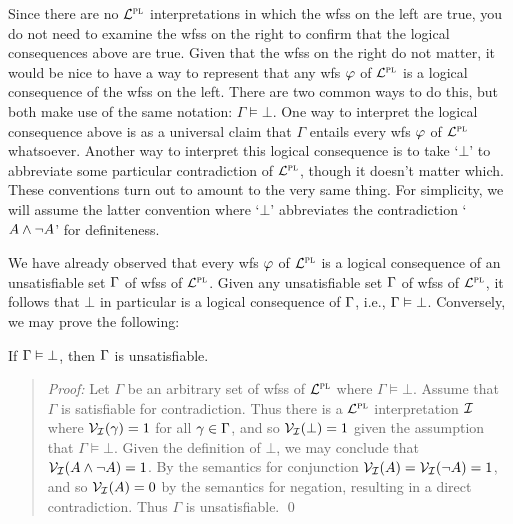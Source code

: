 \begin{earg}
\end{earg}

Since there are no $\mathcal{L}^{\textsc{pl}}$ interpretations in which the wfss on the left are true, you do not need to examine the wfss on the right to confirm that the logical consequences above are true.
Given that the wfss on the right do not matter, it would be nice to have a way to represent that any wfs $\varphi$ of $\mathcal{L}^{\textsc{pl}}$ is a logical consequence of the wfss on the left.
There are two common ways to do this, but both make use of the same notation: $\Gamma \vDash \bot$.
One way to interpret the logical consequence above is as a universal claim that $\Gamma$ entails every wfs $\varphi$ of $\mathcal{L}^{\textsc{pl}}$ whatsoever. 
Another way to interpret this logical consequence is to take `$\bot$' to abbreviate some particular contradiction of $\mathcal{L}^{\textsc{pl}}$, though it doesn't matter which.
These conventions turn out to amount to the very same thing.
For simplicity, we will assume the latter convention where `$\bot$' abbreviates the contradiction `$A \wedge \neg A$' for definiteness.

We have already observed that every wfs $\varphi$ of $\mathcal{L}^{\textsc{pl}}$ is a logical consequence of an unsatisfiable set $\Gamma$ of wfss of $\mathcal{L}^{\textsc{pl}}$.
Given any unsatisfiable set $\Gamma$ of wfss of $\mathcal{L}^{\textsc{pl}}$, it follows that $\bot$ in particular is a logical consequence of $\Gamma$, i.e., $\Gamma \vDash \bot$. 
Conversely, we may prove the following: 

\begin{Lthm} \label{lemma:PL-consequence_unsat}
  If $\Gamma \vDash \bot$, then $\Gamma$ is unsatisfiable. 
\end{Lthm} \vspace{-.2in}

\begin{quote} 
  \textit{Proof:}
  Let $\Gamma$ be an arbitrary set of wfss of $\mathcal{L}^{\textsc{pl}}$ where $\Gamma \vDash \bot$.
  Assume that $\Gamma$ is satisfiable for contradiction.
  Thus there is a $\mathcal{L}^{\textsc{pl}}$ interpretation $\mathcal{I}$ where $\mathcal{V}_{\mathcal{I}}(\gamma) = 1$ for all $\gamma \in \Gamma$, and so $\mathcal{V}_{\mathcal{I}}(\bot) = 1$ given the assumption that $\Gamma \vDash \bot$.
  Given the definition of $\bot$, we may conclude that $\mathcal{V}_{\mathcal{I}}(A \wedge \neg A) = 1$.
  By the semantics for conjunction $\mathcal{V}_{\mathcal{I}}(A) = \mathcal{V}_{\mathcal{I}}(\neg A) = 1$, and so $\mathcal{V}_{\mathcal{I}}(A) = 0$ by the semantics for negation, resulting in a direct contradiction.
  Thus $\Gamma$ is unsatisfiable. 
  \qed
\end{quote}

